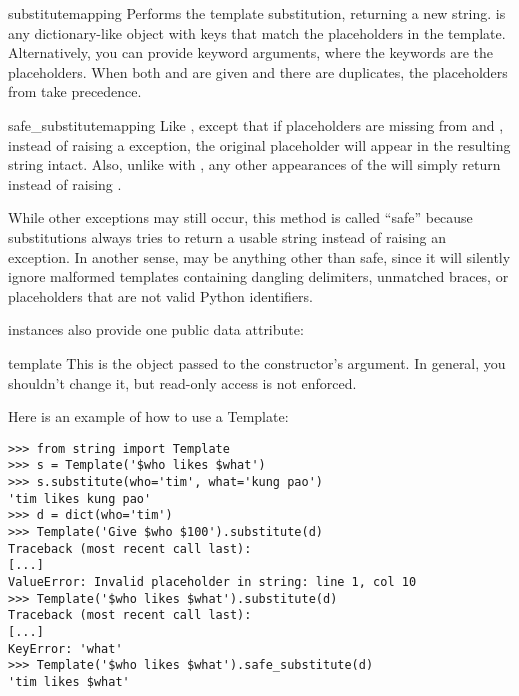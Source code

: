 \begin{methoddesc}[Template]{substitute}{mapping}
Performs the template substitution, returning a new string.   is
any dictionary-like object with keys that match the placeholders in the
template.  Alternatively, you can provide keyword arguments, where the
keywords are the placeholders.  When both  and  are
given and there are duplicates, the placeholders from  take
precedence.
\end{methoddesc}

\begin{methoddesc}[Template]{safe_substitute}{mapping}
Like , except that if placeholders are missing from
 and , instead of raising a 
exception, the original placeholder will appear in the resulting string
intact.  Also, unlike with , any other appearances of the
\samp{\$} will simply return \samp{\$} instead of raising
.

While other exceptions may still occur, this method is called ``safe'' because
substitutions always tries to return a usable string instead of raising an
exception.  In another sense,  may be anything other
than safe, since it will silently ignore malformed templates containing
dangling delimiters, unmatched braces, or placeholders that are not valid
Python identifiers.
\end{methoddesc}

 instances also provide one public data attribute:

\begin{memberdesc}[string]{template}
This is the object passed to the constructor's  argument.  In
general, you shouldn't change it, but read-only access is not enforced.
\end{memberdesc}

Here is an example of how to use a Template:

\begin{verbatim}
>>> from string import Template
>>> s = Template('$who likes $what')
>>> s.substitute(who='tim', what='kung pao')
'tim likes kung pao'
>>> d = dict(who='tim')
>>> Template('Give $who $100').substitute(d)
Traceback (most recent call last):
[...]
ValueError: Invalid placeholder in string: line 1, col 10
>>> Template('$who likes $what').substitute(d)
Traceback (most recent call last):
[...]
KeyError: 'what'
>>> Template('$who likes $what').safe_substitute(d)
'tim likes $what'
\end{verbatim}

